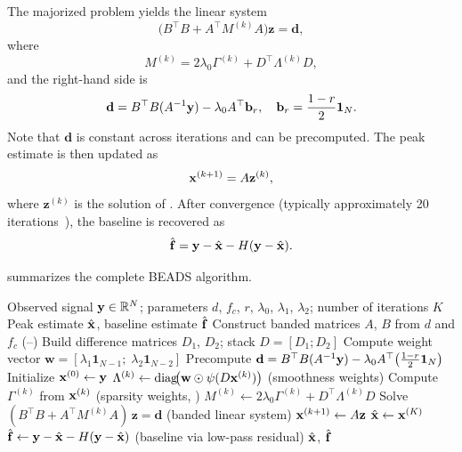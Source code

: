 The majorized problem yields the linear system
\begin{equation}
    \big(B^\top B + A^\top M^{(k)} A\big) \mathbf{z} = \mathbf{d},
    \label{eq:beads_linear_system}
\end{equation}
where
\begin{equation}
    M^{(k)} = 2\lambda_0 \Gamma^{(k)} + D^\top \Lambda^{(k)} D,
    \label{eq:M_matrix}
\end{equation}
and the right-hand side is
\begin{equation}
    \mathbf{d} = B^\top B (A^{-1} \mathbf{y}) - \lambda_0 A^\top \mathbf{b}_r,
    \quad \mathbf{b}_r = \frac{1-r}{2}\mathbf{1}_N.
    \label{eq:rhs_vector}
\end{equation}
Note that $\mathbf{d}$ is constant across iterations and can be precomputed. The peak estimate is then updated as
\begin{equation}
    \mathbf{x}^{(k+1)} = A \mathbf{z}^{(k)},
    \label{eq:x_update}
\end{equation}
where $\mathbf{z}^{(k)}$ is the solution of . After convergence (typically approximately 20 iterations~\cite{ning2014beads}), the baseline is recovered as
\begin{equation}
    \hat{\mathbf{f}} = \mathbf{y} - \hat{\mathbf{x}} - H(\mathbf{y} - \hat{\mathbf{x}}).
    \label{eq:baseline_recovery}
\end{equation}

 summarizes the complete BEADS algorithm.

\begin{algorithm}[t]
\caption{Classical BEADS Algorithm}
\label{alg:beads}
\begin{algorithmic}[1]
\REQUIRE Observed signal $\mathbf{y} \in {\mathbb R}^N$; parameters $d$, $f_c$, $r$, $\lambda_0$, $\lambda_1$, $\lambda_2$; number of iterations $K$
\ENSURE Peak estimate $\hat{\mathbf{x}}$, baseline estimate $\hat{\mathbf{f}}$
\STATE Construct banded matrices $A$, $B$ from $d$ and $f_c$ \hfill (--)
\STATE Build difference matrices $D_1$, $D_2$; stack $D = [D_1; D_2]$
\STATE Compute weight vector $\mathbf{w} = [\lambda_1 \mathbf{1}_{N-1};\; \lambda_2 \mathbf{1}_{N-2}]$
\STATE Precompute $\mathbf{d} = B^\top B (A^{-1} \mathbf{y}) - \lambda_0 A^\top \big(\frac{1-r}{2}\mathbf{1}_N\big)$
\STATE Initialize $\mathbf{x}^{(0)} \leftarrow \mathbf{y}$
    \STATE $\Lambda^{(k)} \leftarrow \text{diag}\!\big(\mathbf{w} \odot \psi(D\mathbf{x}^{(k)})\big)$ \hfill (smoothness weights)
    \STATE Compute $\Gamma^{(k)}$ from $\mathbf{x}^{(k)}$ \hfill (sparsity weights, )
    \STATE $M^{(k)} \leftarrow 2\lambda_0 \Gamma^{(k)} + D^\top \Lambda^{(k)} D$
    \STATE Solve $(B^\top B + A^\top M^{(k)} A)\,\mathbf{z} = \mathbf{d}$ \hfill (banded linear system)
    \STATE $\mathbf{x}^{(k+1)} \leftarrow A\mathbf{z}$
\ENDFOR
\STATE $\hat{\mathbf{x}} \leftarrow \mathbf{x}^{(K)}$
\STATE $\hat{\mathbf{f}} \leftarrow \mathbf{y} - \hat{\mathbf{x}} - H(\mathbf{y} - \hat{\mathbf{x}})$ \hfill (baseline via low-pass residual)
\RETURN $\hat{\mathbf{x}}$, $\hat{\mathbf{f}}$
\end{algorithmic}
\end{algorithm}

